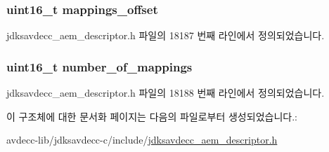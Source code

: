 \subsubsection[{\texorpdfstring{mappings\+\_\+offset}{mappings_offset}}]{\setlength{\rightskip}{0pt plus 5cm}uint16\+\_\+t mappings\+\_\+offset}\hypertarget{structjdksavdecc__descriptor__sensor__unit__map_ac91a41273e32c7bf86ca390838721642}{}\label{structjdksavdecc__descriptor__sensor__unit__map_ac91a41273e32c7bf86ca390838721642}


jdksavdecc\+\_\+aem\+\_\+descriptor.\+h 파일의 18187 번째 라인에서 정의되었습니다.

\subsubsection[{\texorpdfstring{number\+\_\+of\+\_\+mappings}{number_of_mappings}}]{\setlength{\rightskip}{0pt plus 5cm}uint16\+\_\+t number\+\_\+of\+\_\+mappings}\hypertarget{structjdksavdecc__descriptor__sensor__unit__map_ac7db472c5622ef473d5d0a5c416d5531}{}\label{structjdksavdecc__descriptor__sensor__unit__map_ac7db472c5622ef473d5d0a5c416d5531}


jdksavdecc\+\_\+aem\+\_\+descriptor.\+h 파일의 18188 번째 라인에서 정의되었습니다.



이 구조체에 대한 문서화 페이지는 다음의 파일로부터 생성되었습니다.\+:\begin{DoxyCompactItemize}
\item 
avdecc-\/lib/jdksavdecc-\/c/include/\hyperlink{jdksavdecc__aem__descriptor_8h}{jdksavdecc\+\_\+aem\+\_\+descriptor.\+h}\end{DoxyCompactItemize}
